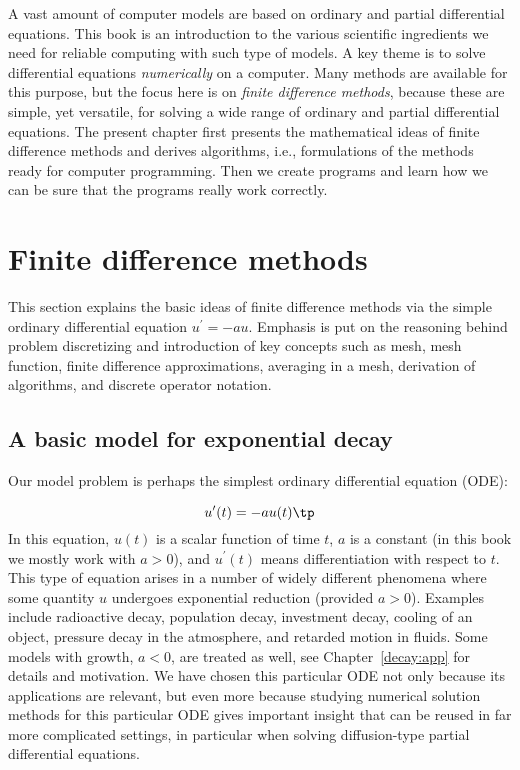 \documentclass[graybox,sectrefs,envcountresetchap,open=right,final]{svmonodo}
\begin{document}
A vast amount of computer models are based on ordinary and partial
differential equations. This book is an introduction to the
various scientific ingredients we need for reliable computing with such
type of models. A key theme is to solve differential equations
\emph{numerically} on a computer. Many methods are available for this purpose,
but the focus here is on \emph{finite difference methods}, because these
are simple, yet versatile, for solving a wide range of ordinary and
partial differential equations. The present chapter first presents the
mathematical ideas of finite difference methods and derives algorithms,
i.e., formulations of the methods ready for computer programming.
Then we create programs and learn how we can be sure that the programs
really work correctly.


\section{Finite difference methods}

\label{decay:basics}

This section explains the basic ideas of finite difference methods
via the simple ordinary differential equation $u^{\prime}=-au$.
Emphasis is put on the reasoning behind problem discretizing and
introduction of key concepts such as mesh, mesh function,
finite difference approximations, averaging in a mesh,
derivation of algorithms, and discrete operator notation.


\subsection{A basic model for exponential decay}
\label{decay:model}

 

Our model problem is perhaps the simplest ordinary differential
equation (ODE):

\begin{equation*}
u^{\prime}(t) = -au(t)\tp
\end{equation*}
In this equation, $u(t)$ is a scalar function of time $t$,
$a$ is a constant (in this book we mostly work with $a>0$),
and $u^{\prime}(t)$ means differentiation with
respect to $t$. This type of equation arises in a number of
widely different phenomena where some quantity $u$ undergoes
exponential reduction (provided $a>0$).
Examples include radioactive decay, population
decay, investment decay, cooling of an object, pressure decay in the
atmosphere, and retarded motion in fluids. Some models with growth,
$a<0$, are treated as
well, see Chapter~\ref{decay:app} for details and motivation.
We have chosen this particular ODE not only because
its applications are relevant, but even more because studying
numerical solution methods for this particular ODE gives important insight
that can be reused in far more complicated settings, in particular
when solving diffusion-type partial differential equations.
\end{document}
